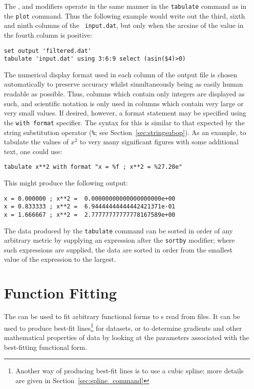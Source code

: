 The ,  and  modifiers operate in
the same manner in the {\tt tabulate} command as in the {\tt plot} command.
Thus the following example would write out the third, sixth and ninth columns
of the \datafile\ {\tt input.dat}, but only when the arcsine of the value in the
fourth column is positive:

\begin{verbatim}
set output 'filtered.dat'
tabulate 'input.dat' using 3:6:9 select (asin($4)>0)
\end{verbatim}

The numerical display format used in each column of the output file is chosen
automatically to preserve accuracy whilst simultaneously being as easily human
readable as possible.  Thus, columns which contain only integers are displayed
as such, and scientific notation is only used in columns which contain very
large or very small values.  If desired, however, a format statement may be
specified using the {\tt with format} specifier. The syntax for this is similar
to that expected by the string substitution operator ({\tt \%}; see
Section~\ref{sec:stringsubop}). As an example, to tabulate the values of $x^2$
to very many significant figures with some additional text, one could use:

\begin{verbatim}
tabulate x**2 with format "x = %f ; x**2 = %27.20e"
\end{verbatim}

\noindent This might produce the following output:

\begin{verbatim}
x = 0.000000 ; x**2 =  0.00000000000000000000e+00
x = 0.833333 ; x**2 =  6.94444444444442421371e-01
x = 1.666667 ; x**2 =  2.77777777777778167589e+00
\end{verbatim}

The data produced by the {\tt tabulate} command can be sorted in order of any
arbitrary metric by supplying an expression after the {\tt sortby} modifier;
where such expressions are supplied, the data are sorted in order from the
smallest value of the expression to the largest.


\section{Function Fitting}
\label{sec:fit_command}

The  can be used to fit arbitrary functional forms to \datapoint s
read from files. It can be used to produce best-fit lines\footnote{Another way of producing best-fit lines is to use a cubic
spline; more details are given in Section~\ref{sec:spline_command}} for
datasets, or to determine gradients and other mathematical properties of data
by looking at the parameters associated with the best-fitting functional form.

